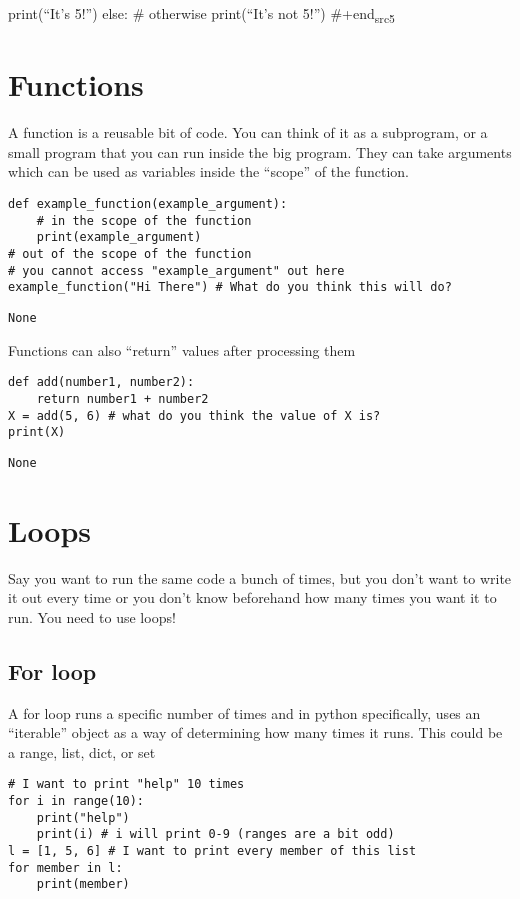 \documentclass{assignments}
\begin{document}
    print(``It's 5!'')
else: \# otherwise
    print(``It's not 5!'')
\#+end\textsubscript{src5}
\section*{Functions}
\label{sec:orgdbfb5da}
A function is a reusable bit of code. You can think of it as a subprogram, or a
small program that you can run inside the big program. They can take arguments
which can be used as variables inside the ``scope'' of the function.
\begin{verbatim}
def example_function(example_argument):
    # in the scope of the function
    print(example_argument)
# out of the scope of the function
# you cannot access "example_argument" out here
example_function("Hi There") # What do you think this will do?
\end{verbatim}

\begin{verbatim}
None
\end{verbatim}


Functions can also ``return'' values after processing them
\begin{verbatim}
def add(number1, number2):
    return number1 + number2
X = add(5, 6) # what do you think the value of X is?
print(X)
\end{verbatim}

\begin{verbatim}
None
\end{verbatim}

\section*{Loops}
\label{sec:org8ba1ab0}
Say you want to run the same code a bunch of times, but you don't want to write
it out every time or you don't know beforehand how many times you want it to
run. You need to use loops!
\subsection*{For loop}
\label{sec:orgcf54ae9}
A for loop runs a specific number of times and in python specifically, uses an
``iterable'' object as a way of determining how many times it runs. This could be
a range, list, dict, or set
\begin{verbatim}
# I want to print "help" 10 times
for i in range(10):
    print("help")
    print(i) # i will print 0-9 (ranges are a bit odd)
l = [1, 5, 6] # I want to print every member of this list
for member in l:
    print(member)
\end{verbatim}
\end{document}
